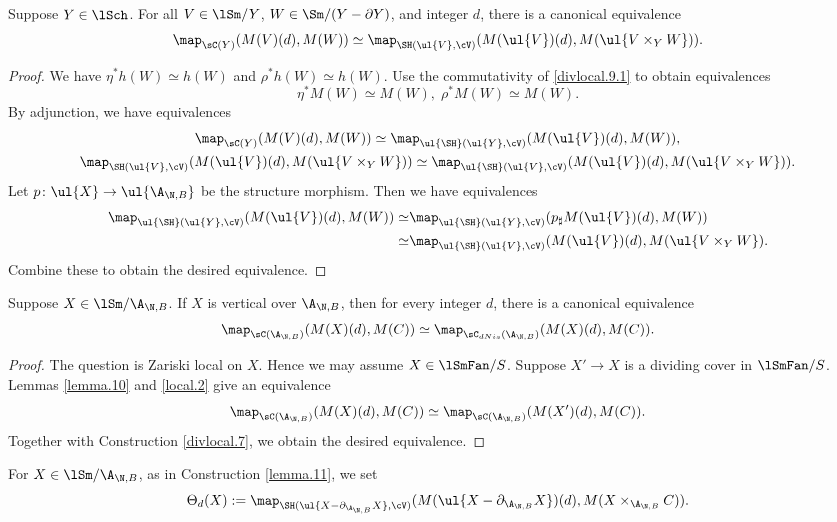 \documentclass[10pt]{amsart}
\begin{document}
\begin{lem}
\label{local.2}
Suppose $Y\in \lSch$.
For all $V\in \lSm/Y$, $W\in \Sm/(Y-\partial Y)$, and integer $d$, there is a canonical equivalence
\[
\map_{\sC(Y)}
(M(V)(d),M(W))
\simeq
\map_{\SH(\ul{V},\cV)}
(M(\ul{V})(d),M(\ul{V\times_{Y}W})).
\]
\end{lem}
\begin{proof}
We have $\eta^*h(W)\simeq h(W)$ and $\rho^*h(W)\simeq h(W)$.
Use the commutativity of \eqref{divlocal.9.1} to obtain equivalences
\[
\eta^*M(W)\simeq M(W),
\;
\rho^*M(W)\simeq M(W).
\]
By adjunction, we have equivalences
\begin{gather*}
\map_{\sC(Y)}
(M(V)(d),M(W))
\simeq
\map_{\ul{\SH}(\ul{Y},\cV)}
(M(\ul{V})(d), M(W)),
\\
\map_{\SH(\ul{V},\cV)}(M(\ul{V})(d),M(\ul{V\times_Y W}))
\simeq
\map_{\ul{\SH}(\ul{V},\cV)}(M(\ul{V})(d),M(\ul{V\times_Y W})).
\end{gather*}
Let $p\colon \ul{X}\to \ul{\A_{\N,B}}$ be the structure morphism.
Then we have equivalences
\begin{align*}
\map_{\ul{\SH}(\ul{Y},\cV)}(M(\ul{V})(d), M(W))
\simeq
& \map_{\ul{\SH}(\ul{Y},\cV)}(p_\sharp M(\ul{V})(d), M(W))
\\
\simeq &
\map_{\ul{\SH}(\ul{V},\cV)}
(M(\ul{V})(d),M(\ul{V\times_Y W}).
\end{align*}
Combine these to obtain the desired equivalence.
\end{proof}


\begin{lem}
\label{local.3}
Suppose $X\in \lSm/{\A_{\N,B}}$.
If $X$ is vertical over $\A_{\N,B}$, then for every integer $d$, there is a canonical equivalence
\[
\map_{\sC(\A_{\N,B})}
(M(X)(d),M(C))
\simeq
\map_{\sC_{dNis}(\A_{\N,B})}
(M(X)(d),M(C)).
\]
\end{lem}
\begin{proof}
The question is Zariski local on $X$.
Hence we may assume $X\in \lSmFan/S$.
Suppose $X'\to X$ is a dividing cover in $\lSmFan/S$.
Lemmas \ref{lemma.10} and \ref{local.2} give an equivalence
\[
\map_{\sC(\A_{\N,B})}
(M(X)(d),M(C))
\simeq
\map_{\sC(\A_{\N,B})}
(M(X')(d),M(C)).
\]
Together with Construction \ref{divlocal.7}, we obtain the desired equivalence.
\end{proof}



For $X\in \lSm/\A_{\N,B}$, as in Construction \ref{lemma.11}, we set
\[
\Theta_d(X)
:=
\map_{\SH(\ul{X-\partial_{\A_{\N,B}}X},\cV)}
(M(\ul{X-\partial_{\A_{\N,B}}X})(d),M(X\times_{\A_{\N,B}}C)).
\]
\end{document}
